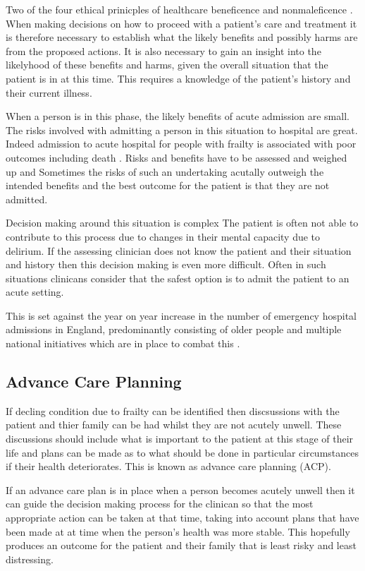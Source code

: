 \documentclass
[
	12pt,
	a4paper,
	oneside,
]{report}
\begin{document}
Two of the four ethical prinicples of healthcare beneficence and nonmaleficence
\parencite{beauchampChildress:01}.
When making decisions on how to proceed with a patient's care and treatment
it is therefore necessary to establish what the likely benefits and possibly 
harms are from the proposed actions. It is also necessary to gain an insight 
into the likelyhood of these benefits and harms, given the overall situation that
the patient is in at this time. This requires a knowledge of the patient's history
and their current illness.


When a person is in this phase, the likely benefits of acute admission are small.
The risks involved with admitting a person in this situation
to hospital are great.  
Indeed admission to acute hospital for people with frailty is associated with
poor outcomes including death \parencite{silver:12, wallis:15}. Risks and 
benefits have to be assessed and 
weighed up and Sometimes the risks of such an undertaking acutally
outweigh the intended benefits and the best outcome for the patient is that 
they are not admitted. 

Decision making around this situation is complex 
The patient is often not able to contribute to this process due to changes in their
mental capacity due to delirium. If the assessing clinician does not know the 
patient and their situation and history then this decision making is even more 
difficult. Often in such situations clinicans consider that the safest option is to 
admit the patient to an acute setting.

This is set against the year on year increase in the number of emergency hospital 
admissions in England, predominantly consisting of older people and multiple 
national initiatives which are in place to combat this \parencite{nao:18}.

\subsection{Advance Care Planning}

If decling condition due to frailty can be identified then discsussions with the 
patient and thier family can be had whilst they are not acutely unwell. These 
discussions should include what is important to the patient at this stage of their
life and plans can be made as to what should be done in particular circumstances
if their health deteriorates. This is known as advance care planning (ACP).

If an advance care plan is in place when a person becomes acutely unwell then it
can guide the decision making process for the clinican so that the most appropriate
action can be taken at that time, taking into account plans that have been made 
at at time when the person's health was more stable. This hopefully produces an
outcome for the patient and their family that is least risky and least distressing.
\end{document}
